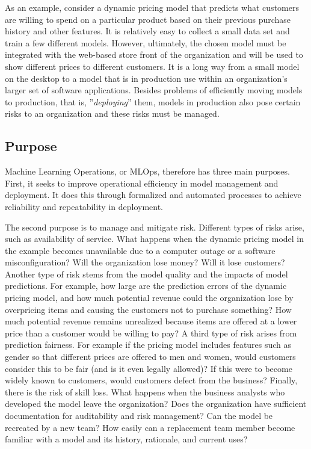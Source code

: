 As an example, consider a dynamic pricing model that predicts what customers are willing to spend on a particular product based on their previous purchase history and other features. It is relatively easy to collect a small data set and train a few different models. However, ultimately, the chosen model must be integrated with the web-based store front of the organization and will be used to show different prices to different customers. It is a long way from a small model on the desktop to a model that is in production use within an organization's larger set of software applications. Besides problems of efficiently moving models to production, that is, ''\emph{deploying}'' them, models in production also pose certain risks to an organization and these risks must be managed. 

\subsection*{Purpose}

Machine Learning Operations, or MLOps, therefore has three main purposes. First, it seeks to improve operational efficiency in model management and deployment. It does this through formalized and automated processes to achieve reliability and repeatability in deployment. 

The second purpose is to manage and mitigate risk. Different types of risks arise, such as availability of service. What happens when the dynamic pricing model in the example becomes unavailable due to a computer outage or a software misconfiguration? Will the organization lose money? Will it lose customers? Another type of risk stems from the model quality and the impacts of model predictions. For example, how large are the prediction errors of the dynamic pricing model, and how much potential revenue could the organization lose by overpricing items and causing the customers not to purchase something? How much potential revenue remains unrealized because items are offered at a lower price than a customer would be willing to pay? A third type of risk arises from prediction fairness. For example if the pricing model includes features such as gender so that different prices are offered to men and women, would customers consider this to be fair (and is it even legally allowed)? If this were to become widely known to customers, would customers defect from the business? Finally, there is the risk of skill loss. What happens when the business analysts who developed the model leave the organization? Does the organization have sufficient documentation for auditability and risk management? Can the model be recreated by a new team? How easily can a replacement team member become familiar with a model and its history, rationale, and current uses?

